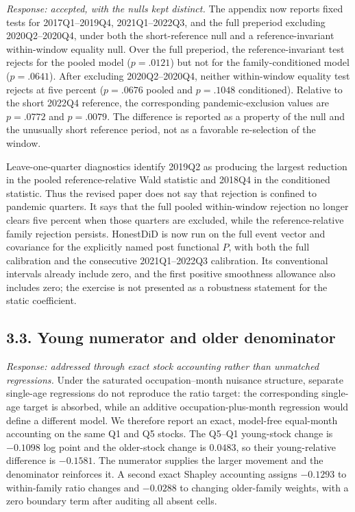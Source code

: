 \documentclass[11pt,letterpaper]{article}
\begin{document}
\emph{Response: accepted, with the nulls kept distinct.}  The appendix now reports fixed tests for 2017Q1--2019Q4, 2021Q1--2022Q3, and the full preperiod excluding 2020Q2--2020Q4, under both the short-reference null and a reference-invariant within-window equality null.  Over the full preperiod, the reference-invariant test rejects for the pooled model ($p=.0121$) but not for the family-conditioned model ($p=.0641$).  After excluding 2020Q2--2020Q4, neither within-window equality test rejects at five percent ($p=.0676$ pooled and $p=.1048$ conditioned).  Relative to the short 2022Q4 reference, the corresponding pandemic-exclusion values are $p=.0772$ and $p=.0079$.  The difference is reported as a property of the null and the unusually short reference period, not as a favorable re-selection of the window.

Leave-one-quarter diagnostics identify 2019Q2 as producing the largest reduction in the pooled reference-relative Wald statistic and 2018Q4 in the conditioned statistic.  Thus the revised paper does not say that rejection is confined to pandemic quarters.  It says that the full pooled within-window rejection no longer clears five percent when those quarters are excluded, while the reference-relative family rejection persists.  HonestDiD is now run on the full event vector and covariance for the explicitly named post functional $P$, with both the full calibration and the consecutive 2021Q1--2022Q3 calibration.  Its conventional intervals already include zero, and the first positive smoothness allowance also includes zero; the exercise is not presented as a robustness statement for the static coefficient.

\subsection*{3.3. Young numerator and older denominator}

\emph{Response: addressed through exact stock accounting rather than unmatched regressions.}  Under the saturated occupation--month nuisance structure, separate single-age regressions do not reproduce the ratio target: the corresponding single-age target is absorbed, while an additive occupation-plus-month regression would define a different model.  We therefore report an exact, model-free equal-month accounting on the same Q1 and Q5 stocks.  The Q5--Q1 young-stock change is $-0.1098$ log point and the older-stock change is $0.0483$, so their young-relative difference is $-0.1581$.  The numerator supplies the larger movement and the denominator reinforces it.  A second exact Shapley accounting assigns $-0.1293$ to within-family ratio changes and $-0.0288$ to changing older-family weights, with a zero boundary term after auditing all absent cells.
\end{document}
